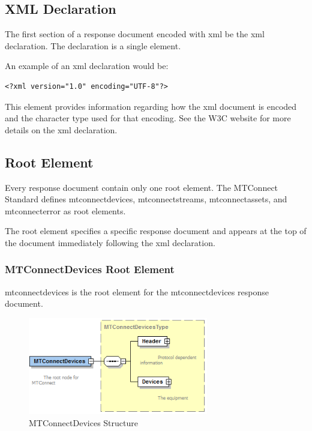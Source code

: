 \subsection{XML Declaration}

The first section of a \gls{response document} encoded with \gls{xml} \SHOULD be the \gls{xml declaration}.  The declaration is a single element.

An example of an \gls{xml declaration} would be:  

\begin{lstlisting}[firstnumber=1,escapechar=|,%
caption={Example of xml declaration}, label={lst:xml-declaration}]
<?xml version="1.0" encoding="UTF-8"?>
\end{lstlisting}

This element provides information regarding how the \gls{xml} document is encoded and the character type used for that encoding.  See the W3C website for more details on the \gls{xml} declaration. 

\subsection{Root Element}

Every \gls{response document} \MUST contain only one root element.  The MTConnect Standard defines \gls{mtconnectdevices}, \gls{mtconnectstreams}, \gls{mtconnectassets}, and \gls{mtconnecterror} as \glspl{root element}. 

The \gls{root element} specifies a specific \gls{response document} and appears at the top of the document immediately following the \gls{xml declaration}.

\subsubsection{MTConnectDevices Root Element}

\gls{mtconnectdevices} is the \gls{root element} for the \gls{mtconnectdevices response document}.  

\begin{figure}[ht]
  \centering
  \includegraphics[width=0.7\textwidth]{figures/mtconnectdevices-structure.png}
  \caption{MTConnectDevices Structure}
  \label{fig:mtconnectdevices-structure}
\end{figure}


